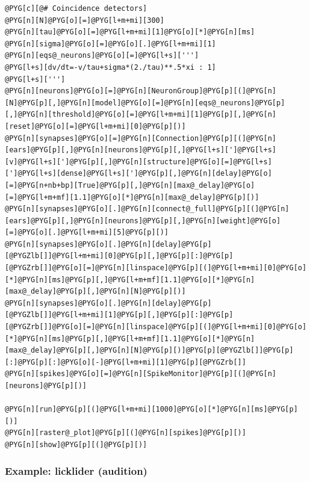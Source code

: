 \documentclass[letterpaper,10pt,english]{manual}
\begin{document}
\begin{Verbatim}[commandchars=@\[\]]
@PYG[c][@# Coincidence detectors]
@PYG[n][N]@PYG[o][=]@PYG[l+m+mi][300]
@PYG[n][tau]@PYG[o][=]@PYG[l+m+mi][1]@PYG[o][*]@PYG[n][ms]
@PYG[n][sigma]@PYG[o][=]@PYG[o][.]@PYG[l+m+mi][1]
@PYG[n][eqs@_neurons]@PYG[o][=]@PYG[l+s][''']
@PYG[l+s][dv/dt=-v/tau+sigma*(2./tau)**.5*xi : 1]
@PYG[l+s][''']
@PYG[n][neurons]@PYG[o][=]@PYG[n][NeuronGroup]@PYG[p][(]@PYG[n][N]@PYG[p][,]@PYG[n][model]@PYG[o][=]@PYG[n][eqs@_neurons]@PYG[p][,]@PYG[n][threshold]@PYG[o][=]@PYG[l+m+mi][1]@PYG[p][,]@PYG[n][reset]@PYG[o][=]@PYG[l+m+mi][0]@PYG[p][)]
@PYG[n][synapses]@PYG[o][=]@PYG[n][Connection]@PYG[p][(]@PYG[n][ears]@PYG[p][,]@PYG[n][neurons]@PYG[p][,]@PYG[l+s][']@PYG[l+s][v]@PYG[l+s][']@PYG[p][,]@PYG[n][structure]@PYG[o][=]@PYG[l+s][']@PYG[l+s][dense]@PYG[l+s][']@PYG[p][,]@PYG[n][delay]@PYG[o][=]@PYG[n+nb+bp][True]@PYG[p][,]@PYG[n][max@_delay]@PYG[o][=]@PYG[l+m+mf][1.1]@PYG[o][*]@PYG[n][max@_delay]@PYG[p][)]
@PYG[n][synapses]@PYG[o][.]@PYG[n][connect@_full]@PYG[p][(]@PYG[n][ears]@PYG[p][,]@PYG[n][neurons]@PYG[p][,]@PYG[n][weight]@PYG[o][=]@PYG[o][.]@PYG[l+m+mi][5]@PYG[p][)]
@PYG[n][synapses]@PYG[o][.]@PYG[n][delay]@PYG[p][@PYGZlb[]]@PYG[l+m+mi][0]@PYG[p][,]@PYG[p][:]@PYG[p][@PYGZrb[]]@PYG[o][=]@PYG[n][linspace]@PYG[p][(]@PYG[l+m+mi][0]@PYG[o][*]@PYG[n][ms]@PYG[p][,]@PYG[l+m+mf][1.1]@PYG[o][*]@PYG[n][max@_delay]@PYG[p][,]@PYG[n][N]@PYG[p][)]
@PYG[n][synapses]@PYG[o][.]@PYG[n][delay]@PYG[p][@PYGZlb[]]@PYG[l+m+mi][1]@PYG[p][,]@PYG[p][:]@PYG[p][@PYGZrb[]]@PYG[o][=]@PYG[n][linspace]@PYG[p][(]@PYG[l+m+mi][0]@PYG[o][*]@PYG[n][ms]@PYG[p][,]@PYG[l+m+mf][1.1]@PYG[o][*]@PYG[n][max@_delay]@PYG[p][,]@PYG[n][N]@PYG[p][)]@PYG[p][@PYGZlb[]]@PYG[p][:]@PYG[p][:]@PYG[o][-]@PYG[l+m+mi][1]@PYG[p][@PYGZrb[]]
@PYG[n][spikes]@PYG[o][=]@PYG[n][SpikeMonitor]@PYG[p][(]@PYG[n][neurons]@PYG[p][)]

@PYG[n][run]@PYG[p][(]@PYG[l+m+mi][1000]@PYG[o][*]@PYG[n][ms]@PYG[p][)]
@PYG[n][raster@_plot]@PYG[p][(]@PYG[n][spikes]@PYG[p][)]
@PYG[n][show]@PYG[p][(]@PYG[p][)]
\end{Verbatim}

\resetcurrentobjects
\hypertarget{--doc-examples-audition_licklider}{}

\hypertarget{index-21}{}\subsubsection{Example: licklider (audition)}
\end{document}
